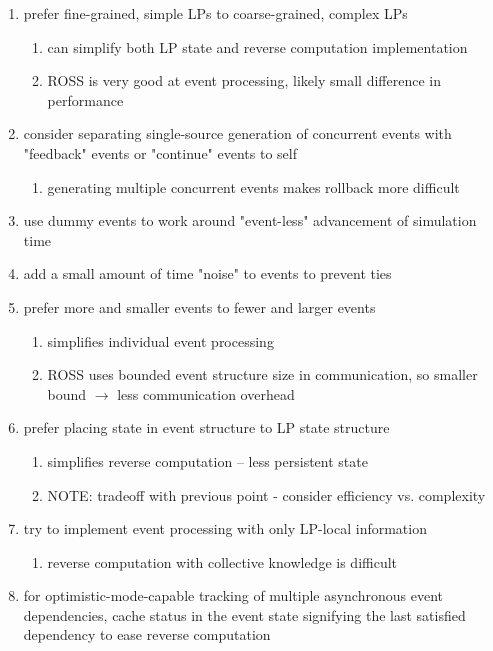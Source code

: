 \documentclass[conference,10pt,compsocconf,onecolumn]{IEEEtran}
\begin{document}
\begin{enumerate}

    \item prefer fine-grained, simple LPs to coarse-grained, complex LPs
    \begin{enumerate}
        \item can simplify both LP state and reverse computation implementation
        \item ROSS is very good at event processing, likely small difference in
            performance
    \end{enumerate}

    \item consider separating single-source generation of concurrent events with
        "feedback" events or "continue" events to self
    \begin{enumerate}
        \item generating multiple concurrent events makes rollback more difficult
    \end{enumerate}

    \item use dummy events to work around "event-less" advancement of simulation time 

    \item add a small amount of time "noise" to events to prevent ties

    \item prefer more and smaller events to fewer and larger events
    \begin{enumerate}
        \item simplifies individual event processing
        \item ROSS uses bounded event structure size in communication, so
            smaller bound $\rightarrow$  less communication overhead
    \end{enumerate}

    \item prefer placing state in event structure to LP state structure
    \begin{enumerate}
        \item simplifies reverse computation -- less persistent state
        \item NOTE: tradeoff with previous point - consider efficiency vs.
            complexity
    \end{enumerate}

    \item try to implement event processing with only LP-local information
    \begin{enumerate}
        \item reverse computation with collective knowledge is difficult
    \end{enumerate}

    \item for optimistic-mode-capable tracking of multiple asynchronous event
        dependencies, cache status in the event state signifying the last
        satisfied dependency to ease reverse computation

\end{enumerate}
\end{document}
